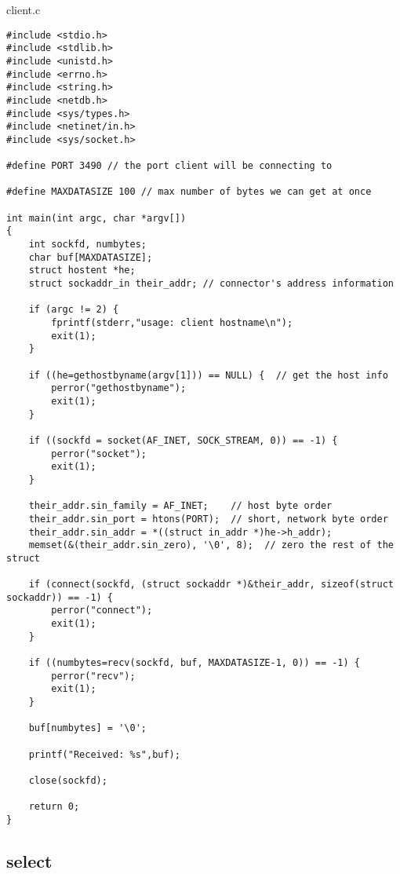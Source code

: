 \documentclass[a4paper]{article}
\begin{document}
client.c
\begin{lstlisting}
#include <stdio.h>
#include <stdlib.h>
#include <unistd.h>
#include <errno.h>
#include <string.h>
#include <netdb.h>
#include <sys/types.h>
#include <netinet/in.h>
#include <sys/socket.h>

#define PORT 3490 // the port client will be connecting to 

#define MAXDATASIZE 100 // max number of bytes we can get at once 

int main(int argc, char *argv[])
{
    int sockfd, numbytes;  
    char buf[MAXDATASIZE];
    struct hostent *he;
    struct sockaddr_in their_addr; // connector's address information 

    if (argc != 2) {
        fprintf(stderr,"usage: client hostname\n");
        exit(1);
    }

    if ((he=gethostbyname(argv[1])) == NULL) {  // get the host info 
        perror("gethostbyname");
        exit(1);
    }

    if ((sockfd = socket(AF_INET, SOCK_STREAM, 0)) == -1) {
        perror("socket");
        exit(1);
    }

    their_addr.sin_family = AF_INET;    // host byte order 
    their_addr.sin_port = htons(PORT);  // short, network byte order 
    their_addr.sin_addr = *((struct in_addr *)he->h_addr);
    memset(&(their_addr.sin_zero), '\0', 8);  // zero the rest of the struct 

    if (connect(sockfd, (struct sockaddr *)&their_addr, sizeof(struct sockaddr)) == -1) {
        perror("connect");
        exit(1);
    }

    if ((numbytes=recv(sockfd, buf, MAXDATASIZE-1, 0)) == -1) {
        perror("recv");
        exit(1);
    }

    buf[numbytes] = '\0';

    printf("Received: %s",buf);

    close(sockfd);

    return 0;
}
\end{lstlisting}
\subsection{select}
\end{document}
